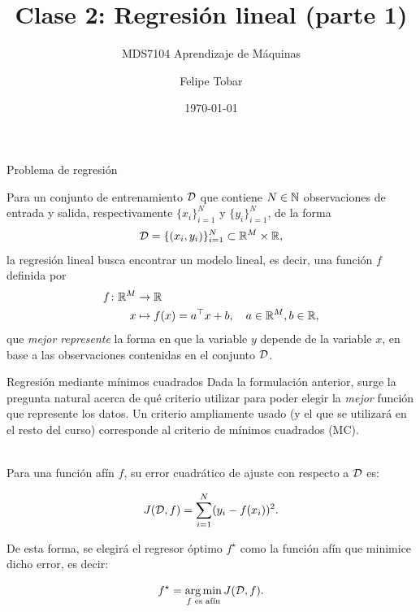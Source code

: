 \documentclass[handout, 9pt]{beamer}
\title{Clase 2: Regresión lineal (parte 1)}
\subtitle{MDS7104 Aprendizaje de Máquinas}
\date{\today}
\author{Felipe Tobar}
\institute{Iniciativa de Datos e Inteligencia Artificial\\Universidad de Chile}
\begin{document}
\begin{frame}
  \titlepage
\end{frame}


\begin{frame}{Problema de regresión}
	
Para un conjunto de entrenamiento ${\mathcal D}$ que contiene $N\in{\mathbb N}$ observaciones de entrada y salida, respectivamente $\{x_i\}_{i=1}^N$ y $\{y_i\}_{i=1}^N$, de la forma
\begin{equation*}
	{\mathcal D}=\{(x_i,y_i)\}_{i=1}^N\subset \mathbb{R}^M \times \mathbb{R},
	\label{eq:training_set}
\end{equation*}\pause
la regresión lineal busca encontrar un modelo lineal, es decir, una función $f$ definida por 
\begin{align*}
  f \colon \mathbb{R}^M &\to \mathbb{R}\nonumber\\
  x &\mapsto f(x)=a^\top x + b,\quad a\in\mathbb{R}^M,b\in\mathbb{R},
\end{align*}
que \emph{mejor represente} la forma en que la variable $y$ depende de la variable $x$, en base a las observaciones contenidas en el conjunto ${\mathcal D}$.

\end{frame}

\begin{frame}{Regresión mediante mínimos cuadrados}
Dada la formulación anterior, surge la pregunta natural acerca de qué criterio utilizar para poder elegir la \emph{mejor} función que represente los datos. Un criterio ampliamente usado (y el que se utilizará en el resto del curso) corresponde al criterio de mínimos cuadrados (MC).\\~\ \pause

Para una función afín $f$, su error cuadrático de ajuste con respecto a ${\mathcal D}$ es:

\begin{equation*}
	J({\mathcal D},f) = \sum_{i=1}^N(y_i-f(x_i))^2.
	\label{eq:least_squares_cost}
\end{equation*}\pause

De esta forma, se elegirá el regresor óptimo $f^\star$ como la función afín que minimice dicho error, es decir:

\begin{equation*}
	f^\star = \operatorname*{arg\,min}_{f\text{ es afín}} J({\mathcal D},f).
\end{equation*}

\end{frame}
\end{document}
